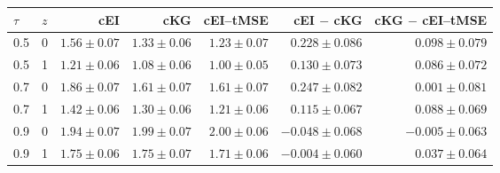 \begin{tabular}{@{}llrrrrr@{}}
\toprule
$\tau$ & $z$ & cEI & cKG & cEI--tMSE & cEI $-$ cKG & cKG $-$ cEI--tMSE \\
\midrule
0.5 & 0 & $1.56{\pm}0.07$ & $1.33{\pm}0.06$ & $1.23{\pm}0.07$ & $0.228{\pm}0.086$ & $0.098{\pm}0.079$ \\
0.5 & 1 & $1.21{\pm}0.06$ & $1.08{\pm}0.06$ & $1.00{\pm}0.05$ & $0.130{\pm}0.073$ & $0.086{\pm}0.072$ \\
0.7 & 0 & $1.86{\pm}0.07$ & $1.61{\pm}0.07$ & $1.61{\pm}0.07$ & $0.247{\pm}0.082$ & $0.001{\pm}0.081$ \\
0.7 & 1 & $1.42{\pm}0.06$ & $1.30{\pm}0.06$ & $1.21{\pm}0.06$ & $0.115{\pm}0.067$ & $0.088{\pm}0.069$ \\
0.9 & 0 & $1.94{\pm}0.07$ & $1.99{\pm}0.07$ & $2.00{\pm}0.06$ & $-0.048{\pm}0.068$ & $-0.005{\pm}0.063$ \\
0.9 & 1 & $1.75{\pm}0.06$ & $1.75{\pm}0.07$ & $1.71{\pm}0.06$ & $-0.004{\pm}0.060$ & $0.037{\pm}0.064$ \\
\bottomrule
\end{tabular}
